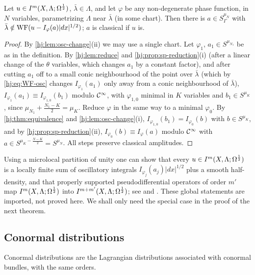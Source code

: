 \begin{theorem}\label{hj:thm:independence}
  Let $u\in I^{m}(X,\Lambda;\Omega^{\frac12})$, $\bar\lambda\in\Lambda$, and let $\varphi$ be
  any non-degenerate phase function, in $N$ variables, parametrizing $\Lambda$
  near $\bar\lambda$ (in some chart).  Then there is $a\in S^{\mu_N}_\Gamma$ with
  $\bar\lambda\notin\operatorname{WF}(u-I_\varphi(a)|dx|^{1/2})$; $a$ is classical if $u$ is.
\end{theorem}
\begin{proof}
  By \cref{hj:lem:osc-change}(ii) we may use a single chart.  Let
  $\varphi_1$, $a_1\in S^{\mu_{N_1}}$ be as in the definition.  By
  \cref{hj:lem:reduce} and \cref{hj:prop:sp-reduction}(i) (after a linear change
  of the $\theta$ variables, which changes $a_1$ by a constant factor), and
  after cutting $a_1$ off to a small conic neighbourhood of the point over
  $\bar\lambda$ (which by \eqref{hj:eq:WF-osc} changes $I_{\varphi_1}(a_1)$ only
  away from a conic neighbourhood of $\bar\lambda$), $I_{\varphi_1}(a_1)\equiv
  I_{\varphi_{1,0}}(b_1)$ modulo $\mathcal{C}^\infty$, with $\varphi_{1,0}$ minimal in $K$
  variables and $b_1\in S^{\mu_K}$, since $\mu_{N_1}+\frac{N_1-K}2=\mu_K$.  Reduce
  $\varphi$ in the same way to a minimal $\varphi_0$.  By
  \cref{hj:thm:equivalence} and \cref{hj:lem:osc-change}(i),
  $I_{\varphi_{1,0}}(b_1)=I_{\varphi_0}(b)$ with $b\in S^{\mu_K}$, and by
  \cref{hj:prop:sp-reduction}(ii), $I_{\varphi_0}(b)\equiv I_\varphi(a)$ modulo
  $\mathcal{C}^\infty$ with $a\in S^{\mu_K-\frac{N-K}2}=S^{\mu_N}$.  All steps preserve
  classical amplitudes.
\end{proof}

\begin{remark}\label{hj:rem:global}
  Using a microlocal partition of unity one can show that every
  $u\in I^{m}(X,\Lambda;\Omega^{\frac12})$ is a locally finite sum of oscillatory
  integrals $I_{\varphi_j}(a_j)|dx|^{1/2}$ plus a smooth half-density, and that
  properly supported pseudodifferential operators of order $m'$ map
  $I^{m}(X,\Lambda;\Omega^{\frac12})$ into $I^{m+m'}(X,\Lambda;\Omega^{\frac12})$; see
  \cite[Chapter~25]{Hormander-IV} and \cite{Hormander-FIO}.  These
  global statements are imported, not proved here.  We shall only need
  the special case in the proof of the next theorem.
\end{remark}

\subsection{Conormal distributions}
Conormal distributions are the Lagrangian distributions associated with
conormal bundles, with the same orders.

